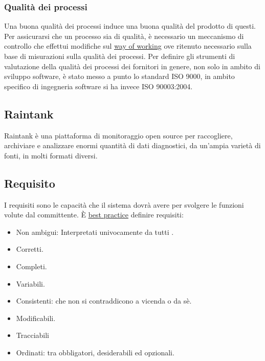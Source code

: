 	\subsubsection{Qualità dei processi}
	\label{sec:qualitaprocesso}
	Una buona qualità dei processi induce una buona qualità del prodotto di questi. Per assicurarsi che un processo sia di qualità, è necessario un meccanismo di controllo che effettui modifiche sul \underline{\hyperref[sec:wow]{\underline{\hyperref[sec:wow]{way of working}}}} ove ritenuto necessario sulla base di misurazioni sulla qualità dei processi. Per definire gli strumenti di valutazione della qualità dei processi dei fornitori in genere, non solo in ambito di sviluppo software, è stato messo a punto lo standard ISO 9000, in ambito specifico di ingegneria software si ha invece ISO 90003:2004.
	
		\newpage

	\subsection{Raintank}
	Raintank è una piattaforma di monitoraggio open source per raccogliere, archiviare e analizzare enormi quantità di dati diagnostici, da un'ampia varietà di fonti, in molti formati diversi.
	
	\subsection{Requisito}
	\label{sec:requisito}
	I requisiti sono le capacità che il sistema dovrà avere per svolgere le funzioni volute dal committente. È \underline{\hyperref[sec:bestpractice]{best practice}} definire requisiti:
	\begin{itemize}  
	\item Non ambigui: Interpretati univocamente da tutti .
	\item Corretti.
	\item Completi.
	\item Variabili.
	\item Consistenti: che non si contraddicono a vicenda o da sè.
	\item Modificabili.
	\item Tracciabili
	\item Ordinati: tra obbligatori, desiderabili ed opzionali. 
	\end{itemize}

